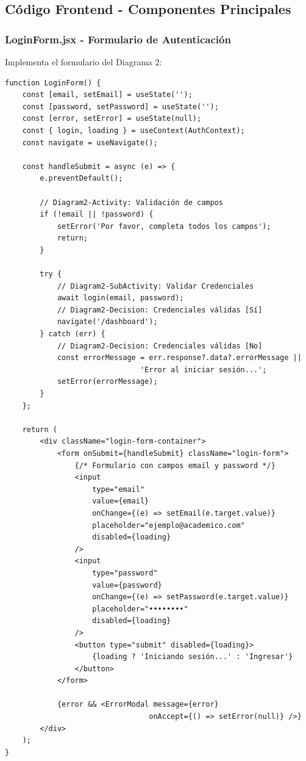 \documentclass[11pt,a4paper]{article}
\begin{document}

\subsection{Código Frontend - Componentes Principales}

\subsubsection{LoginForm.jsx - Formulario de Autenticación}

Implementa el formulario del Diagrama 2:

\begin{verbatim}
function LoginForm() {
    const [email, setEmail] = useState('');
    const [password, setPassword] = useState('');
    const [error, setError] = useState(null);
    const { login, loading } = useContext(AuthContext);
    const navigate = useNavigate();

    const handleSubmit = async (e) => {
        e.preventDefault();
        
        // Diagram2-Activity: Validación de campos
        if (!email || !password) {
            setError('Por favor, completa todos los campos');
            return;
        }

        try {
            // Diagram2-SubActivity: Validar Credenciales
            await login(email, password);
            // Diagram2-Decision: Credenciales válidas [Sí]
            navigate('/dashboard');
        } catch (err) {
            // Diagram2-Decision: Credenciales válidas [No]
            const errorMessage = err.response?.data?.errorMessage || 
                               'Error al iniciar sesión...';
            setError(errorMessage);
        }
    };

    return (
        <div className="login-form-container">
            <form onSubmit={handleSubmit} className="login-form">
                {/* Formulario con campos email y password */}
                <input
                    type="email"
                    value={email}
                    onChange={(e) => setEmail(e.target.value)}
                    placeholder="ejemplo@academico.com"
                    disabled={loading}
                />
                <input
                    type="password"
                    value={password}
                    onChange={(e) => setPassword(e.target.value)}
                    placeholder="••••••••"
                    disabled={loading}
                />
                <button type="submit" disabled={loading}>
                    {loading ? 'Iniciando sesión...' : 'Ingresar'}
                </button>
            </form>
            
            {error && <ErrorModal message={error} 
                                 onAccept={() => setError(null)} />}
        </div>
    );
}
\end{verbatim}
\end{document}
